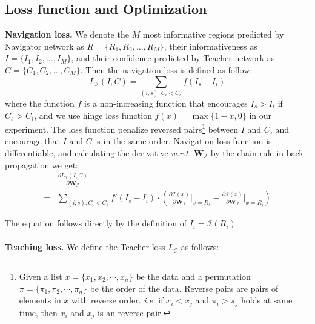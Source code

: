 \documentclass[runningheads]{llncs}
\begin{document}
\subsection{Loss function and Optimization}\label{sec_loss}
\textbf{Navigation loss.}
We denote the $M$ most informative regions predicted by Navigator network as $R = \{R_1, R_2, \dots, R_M\}$, their informativeness as $I = \{I_1, I_2, \dots, I_M\}$, and their confidence predicted by Teacher network as $C = \{C_1, C_2, \dots, C_M\}$. Then the navigation loss is defined as follow:
\begin{equation}\label{navigator_loss}
	L_{\mathcal I}(I, C) = \sum_{(i,s):C_i < C_s} f(I_s-I_i)
\end{equation}
where the function $f$ is a non-increasing function that encourages $I_s>I_i$ if $C_s>C_i$, and we use hinge loss function $f(x) = \max\{1-x,0\}$ in our experiment. The loss function penalize reversed pairs\footnote{Given a list $x=\{x_1, x_2, \cdots, x_n\}$ be the data and a permutation $\pi=\{\pi_1, \pi_2, \cdots, \pi_n\}$ be the order of the data. Reverse pairs are pairs of elements in $x$ with reverse order. \emph{i.e.} if $x_i<x_j$ and $\pi_i>\pi_j$ holds at same time, then $x_i$ and $x_j$ is an reverse pair.} between $I$ and $C$, and encourage that $I$ and $C$ is in the same order. Navigation loss function is differentiable, and calculating the derivative \emph{w.r.t.} $\mathbf W_{\mathcal I}$ by the chain rule in back-propagation we get:
\begin{align}\label{navigator_loss_doff}
	&\frac{\partial L_{\mathcal I}(I, C)}{\partial \mathbf W_{\mathcal I}} \\
	= &\sum_{(i,s):C_i < C_s} f'(I_s-I_i)\cdot (\frac{\partial \mathcal I(x)}{\partial \mathbf W_{\mathcal I}}\Bigr |_{x = R_s}-\frac{\partial \mathcal I(x)}{\partial \mathbf W_{\mathcal I}}\Bigr |_{x = R_i}) \nonumber
\end{align}

The equation follows directly by the definition of $I_i = \mathcal I(R_i)$.\\\\
\textbf{Teaching loss.}
We define the Teacher loss $L_{\mathcal C}$ as follows:
\end{document}
